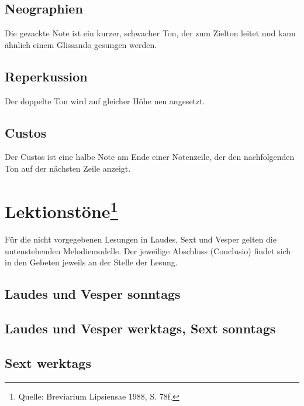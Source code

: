 \subsection*{Neographien}
Die gezackte Note ist ein kurzer, schwacher Ton, der zum Zielton leitet und kann
ähnlich einem Glissando gesungen werden.\par
{}
\subsection*{Reperkussion}
Der doppelte Ton wird auf gleicher Höhe neu angesetzt.
\subsection*{Custos}
Der Custos ist eine halbe Note am Ende einer Notenzeile, der den nachfolgenden
Ton auf der nächsten Zeile anzeigt.\par
\section*{Lektionstöne\protect\footnote{Quelle: Breviarium Lipsiensae 1988, S. 78f.}}
Für die nicht vorgegebenen Lesungen in Laudes, Sext und Vesper gelten die untenstehenden Melodiemodelle. Der jeweilige Abschluss (Conclusio) findet sich in den Gebeten jeweils an der Stelle der Lesung.\par
\subsection*{Laudes und Vesper sonntags}
\subsection*{Laudes und Vesper werktags, Sext sonntags}
\subsection*{Sext werktags}

